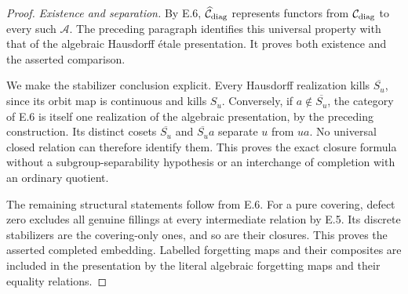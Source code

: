 \begin{proof}
\emph{Existence and separation.}
By E.6, $\widehat{\mathcal C}_{\rm diag}$ represents functors
from $\mathcal C_{\rm diag}$ to every such $\mathcal A$.
The preceding paragraph identifies this universal property
with that of the algebraic Hausdorff \'etale presentation.
It proves both existence and the asserted comparison.

We make the stabilizer conclusion explicit. Every Hausdorff
realization kills $\overline{S_u}$, since its orbit map is
continuous and kills $S_u$. Conversely, if
$a\notin\overline{S_u}$, the category of E.6 is itself
one realization of the algebraic presentation, by the
preceding construction. Its distinct cosets
$\overline{S_u}$ and $\overline{S_u}a$ separate $u$
from $ua$. No universal closed relation can therefore
identify them. This proves the exact closure formula
without a subgroup-separability hypothesis or an
interchange of completion with an ordinary quotient.

The remaining structural statements follow from E.6.
For a pure covering, defect zero excludes all genuine
fillings at every intermediate relation by E.5. Its
discrete stabilizers are the covering-only ones, and so
are their closures. This proves the asserted completed
embedding. Labelled forgetting maps and their composites
are included in the presentation by the literal
algebraic forgetting maps and their equality relations.
\end{proof}

